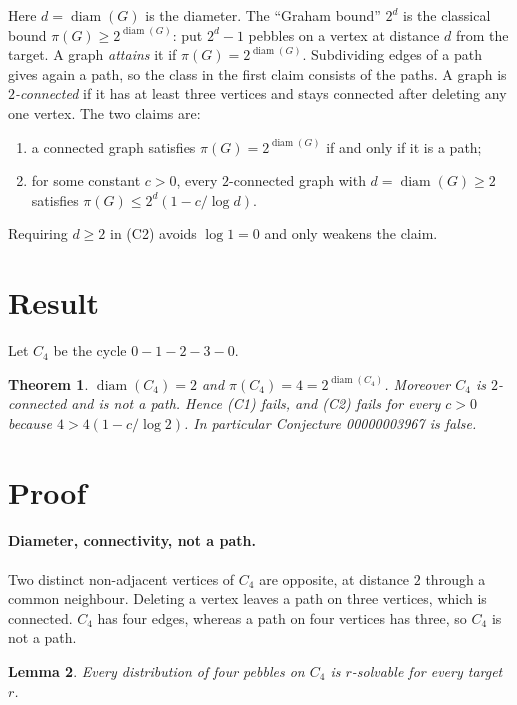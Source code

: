 \documentclass[11pt]{article}
\theoremstyle{plain}
\newtheorem{theorem}{Theorem}
\newtheorem{lemma}[theorem]{Lemma}
\theoremstyle{definition}
\theoremstyle{remark}
\newcommand{\diam}{\operatorname{diam}}
\begin{document}
Here $d=\diam(G)$ is the diameter. The ``Graham bound'' $2^d$ is the classical bound
$\pi(G)\ge2^{\diam(G)}$: put $2^d-1$ pebbles on a vertex at distance $d$ from the
target. A graph \emph{attains} it if $\pi(G)=2^{\diam(G)}$. Subdividing edges of a path
gives again a path, so the class in the first claim consists of the paths. A graph is
\emph{$2$-connected} if it has at least three vertices and stays connected after
deleting any one vertex. The two claims are:
\begin{enumerate}
\item[(C1)] a connected graph satisfies $\pi(G)=2^{\diam(G)}$ if and only if it is a
  path;
\item[(C2)] for some constant $c>0$, every $2$-connected graph with $d=\diam(G)\ge2$
  satisfies $\pi(G)\le2^d(1-c/\log d)$.
\end{enumerate}
Requiring $d\ge2$ in (C2) avoids $\log1=0$ and only weakens the claim.

\section{Result}

Let $C_4$ be the cycle $0-1-2-3-0$.

\begin{theorem}\label{thm:main}
$\diam(C_4)=2$ and $\pi(C_4)=4=2^{\diam(C_4)}$. Moreover $C_4$ is $2$-connected and is
not a path. Hence (C1) fails, and (C2) fails for every $c>0$ because
$4>4(1-c/\log2)$. In particular Conjecture 00000003967 is false.
\end{theorem}

\section{Proof}

\paragraph{Diameter, connectivity, not a path.} Two distinct non-adjacent vertices of
$C_4$ are opposite, at distance $2$ through a common neighbour. Deleting a vertex
leaves a path on three vertices, which is connected. $C_4$ has four edges, whereas a
path on four vertices has three, so $C_4$ is not a path.

\begin{lemma}\label{lem:upper}
Every distribution of four pebbles on $C_4$ is $r$-solvable for every target $r$.
\end{lemma}
\end{document}
